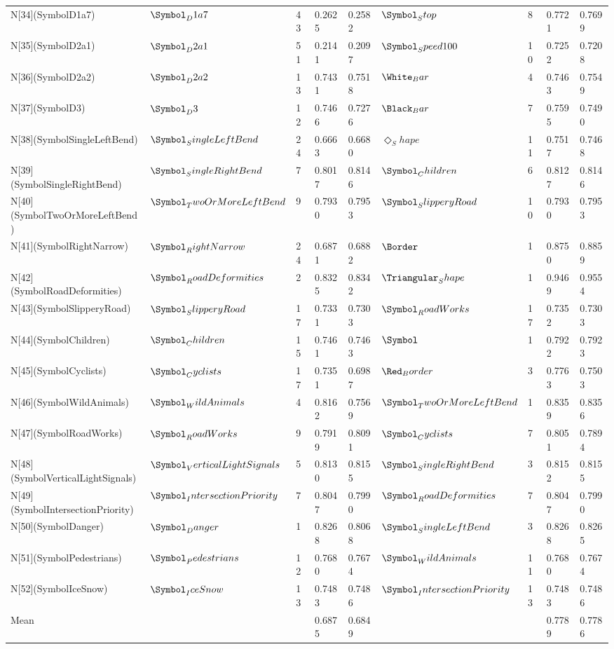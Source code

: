 \begin{tabular}{lllllllll}
N[34](SymbolD1a7) & $\Symbol_D1a7$ & 43 & 0.2625 & 0.2582 & $\Symbol_Stop$ & 8 & 0.7721 & 0.7699 \\
N[35](SymbolD2a1) & $\Symbol_D2a1$ & 51 & 0.2141 & 0.2097 & $\Symbol_Speed100$ & 10 & 0.7252 & 0.7208 \\
N[36](SymbolD2a2) & $\Symbol_D2a2$ & 13 & 0.7431 & 0.7518 & $\White_Bar$ & 4 & 0.7463 & 0.7549 \\
N[37](SymbolD3) & $\Symbol_D3$ & 12 & 0.7466 & 0.7276 & $\Black_Bar$ & 7 & 0.7595 & 0.7490 \\
N[38](SymbolSingleLeftBend) & $\Symbol_SingleLeftBend$ & 24 & 0.6663 & 0.6680 & $\Diamond_Shape$ & 11 & 0.7517 & 0.7468 \\
N[39](SymbolSingleRightBend) & $\Symbol_SingleRightBend$ & 7 & 0.8017 & 0.8146 & $\Symbol_Children$ & 6 & 0.8127 & 0.8146 \\
N[40](SymbolTwoOrMoreLeftBend) & $\Symbol_TwoOrMoreLeftBend$ & 9 & 0.7930 & 0.7953 & $\Symbol_SlipperyRoad$ & 10 & 0.7930 & 0.7953 \\
N[41](SymbolRightNarrow) & $\Symbol_RightNarrow$ & 24 & 0.6871 & 0.6882 & $\Border$ & 1 & 0.8750 & 0.8859 \\
N[42](SymbolRoadDeformities) & $\Symbol_RoadDeformities$ & 2 & 0.8325 & 0.8342 & $\Triangular_Shape$ & 1 & 0.9469 & 0.9554 \\
N[43](SymbolSlipperyRoad) & $\Symbol_SlipperyRoad$ & 17 & 0.7331 & 0.7303 & $\Symbol_RoadWorks$ & 17 & 0.7352 & 0.7303 \\
N[44](SymbolChildren) & $\Symbol_Children$ & 15 & 0.7461 & 0.7463 & $\Symbol$ & 1 & 0.7922 & 0.7923 \\
N[45](SymbolCyclists) & $\Symbol_Cyclists$ & 17 & 0.7351 & 0.6987 & $\Red_Border$ & 3 & 0.7763 & 0.7503 \\
N[46](SymbolWildAnimals) & $\Symbol_WildAnimals$ & 4 & 0.8162 & 0.7569 & $\Symbol_TwoOrMoreLeftBend$ & 1 & 0.8359 & 0.8356 \\
N[47](SymbolRoadWorks) & $\Symbol_RoadWorks$ & 9 & 0.7919 & 0.8091 & $\Symbol_Cyclists$ & 7 & 0.8051 & 0.7894 \\
N[48](SymbolVerticalLightSignals) & $\Symbol_VerticalLightSignals$ & 5 & 0.8130 & 0.8155 & $\Symbol_SingleRightBend$ & 3 & 0.8152 & 0.8155 \\
N[49](SymbolIntersectionPriority) & $\Symbol_IntersectionPriority$ & 7 & 0.8047 & 0.7990 & $\Symbol_RoadDeformities$ & 7 & 0.8047 & 0.7990 \\
N[50](SymbolDanger) & $\Symbol_Danger$ & 1 & 0.8268 & 0.8068 & $\Symbol_SingleLeftBend$ & 3 & 0.8268 & 0.8265 \\
N[51](SymbolPedestrians) & $\Symbol_Pedestrians$ & 12 & 0.7680 & 0.7674 & $\Symbol_WildAnimals$ & 11 & 0.7680 & 0.7674 \\
N[52](SymbolIceSnow) & $\Symbol_IceSnow$ & 13 & 0.7483 & 0.7486 & $\Symbol_IntersectionPriority$ & 13 & 0.7483 & 0.7486 \\
Mean &  &  & 0.6875 & 0.6849 &  &  & 0.7789 & 0.7786 \\
\bottomrule
\end{tabular}
